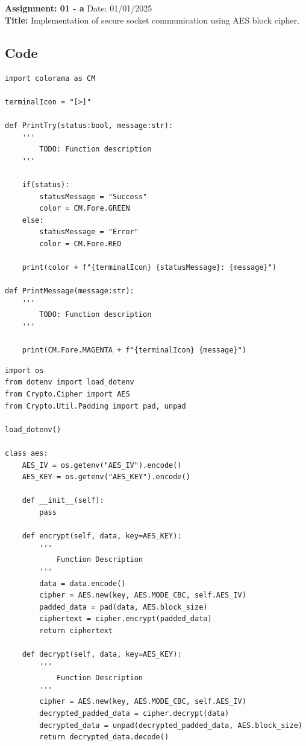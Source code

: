 \section{}
\noindent \textbf{Assignment: 01 - a}
\hfill Date: 01/01/2025 \\
\noindent
\textbf{Title:} Implementation of secure socket communication using AES block cipher.

\subsection*{Code}



\begin{lstlisting}[style=mypython, caption={TerminalMessage.py}, label={code:A-1-a-TerminalMessgae}]
import colorama as CM

terminalIcon = "[>]"

def PrintTry(status:bool, message:str):
    '''
        TODO: Function description
    '''

    if(status):
        statusMessage = "Success"
        color = CM.Fore.GREEN
    else:
        statusMessage = "Error"
        color = CM.Fore.RED

    print(color + f"{terminalIcon} {statusMessage}: {message}")

def PrintMessage(message:str):
    '''
        TODO: Function description
    '''

    print(CM.Fore.MAGENTA + f"{terminalIcon} {message}")
\end{lstlisting}

\begin{lstlisting}[style=mypython, caption={Encryption.py}, label={code:A-1-a-Encryption}]
import os
from dotenv import load_dotenv
from Crypto.Cipher import AES
from Crypto.Util.Padding import pad, unpad

load_dotenv()

class aes:
    AES_IV = os.getenv("AES_IV").encode()
    AES_KEY = os.getenv("AES_KEY").encode()

    def __init__(self):
        pass

    def encrypt(self, data, key=AES_KEY):
        '''
            Function Description
        '''
        data = data.encode()
        cipher = AES.new(key, AES.MODE_CBC, self.AES_IV)
        padded_data = pad(data, AES.block_size)
        ciphertext = cipher.encrypt(padded_data)
        return ciphertext
    
    def decrypt(self, data, key=AES_KEY):
        '''
            Function Description
        '''
        cipher = AES.new(key, AES.MODE_CBC, self.AES_IV)
        decrypted_padded_data = cipher.decrypt(data)
        decrypted_data = unpad(decrypted_padded_data, AES.block_size)
        return decrypted_data.decode()
\end{lstlisting}

